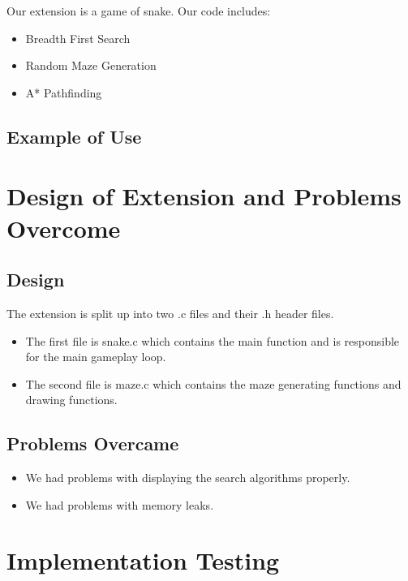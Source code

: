 \documentclass[11pt]{article}
\begin{document}
Our extension is a game of snake. Our code includes:

\begin{itemize}
    \item Breadth First Search
    \item Random Maze Generation
    \item A* Pathfinding
\end{itemize}

\subsection{Example of Use}


\graphicspath{ {./images/} }



\section{Design of Extension and Problems Overcome}

\subsection{Design}

The extension is split up into two .c files and their .h header files.
\begin{itemize}
    \item The first file is snake.c which contains the main function and is responsible for the main gameplay loop.
    \item The second file is maze.c which contains the maze generating functions and drawing functions.
\end{itemize}




\subsection{Problems Overcame}

\begin{itemize}
    \item We had problems with displaying the search algorithms properly.
    \item We had problems with memory leaks.
\end{itemize}

\section{Implementation Testing}
\end{document}

